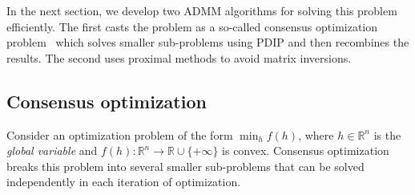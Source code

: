 \documentclass{article}
\DeclareMathOperator*{\argmin}{argmin}
\newcommand{\norm}[1]{\left\lVert #1 \right\rVert}
\begin{document}
In the next section, we develop two ADMM algorithms for solving this
problem efficiently. The first casts the problem as a
so-called consensus optimization problem~\citep{boyd_distributed_2011}
which solves smaller sub-problems using PDIP and then recombines the results. The
second uses proximal methods to avoid matrix inversions.
 

\subsection{Consensus optimization}
\label{sec:consOpt}

Consider an optimization problem of the form $\min_h f(h)$, where
$h\in\mathbb{R}^n$ is the \textit{global variable} and
$f(h):\mathbb{R}^n \rightarrow \mathbb{R}\cup \{+\infty\}$ is
convex. Consensus optimization breaks this problem
into several smaller sub-problems that can be solved independently in
each iteration of optimization.  
\end{document}
